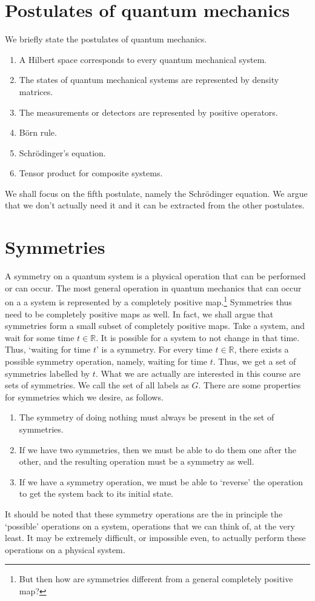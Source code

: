 \documentclass[a4 paper, 12pt]{book}
\theoremstyle{definition}
\newcommand{\rr}{\mathbb{R}}
\begin{document}
	\section{Postulates of quantum mechanics}

	We briefly state the postulates of quantum mechanics.
	\begin{enumerate}
	    \item A Hilbert space corresponds to every quantum mechanical system.
		\item The states of quantum mechanical systems are represented by density matrices.
		\item The measurements or detectors are represented by positive operators.
		\item B\"orn rule.
		\item Schr\"odinger's equation.
		\item Tensor product for composite systems.
	\end{enumerate}
	We shall focus on the fifth postulate, namely the Schr\"odinger equation. We argue that we don't actually need it and it can be extracted from the other postulates.

	\section{Symmetries}

	A symmetry on a quantum system is a physical operation that can be performed or can occur. The most general operation in quantum mechanics that can occur on a a system is represented by a completely positive map.\footnote{But then how are symmetries different from a general completely positive map?} Symmetries thus need to be completely positive maps as well. In fact, we shall argue that symmetries form a small subset of completely positive maps.
	Take a system, and wait for some time \(t \in \rr\). It is possible for a system to not change in that time. Thus, `waiting for time \(t\)' is a symmetry. For every time \(t \in \rr\), there exists a possible symmetry operation, namely, waiting for time \(t\). Thus, we get a set of symmetries labelled by \(t\). What we are actually are interested in this course are sets of symmetries. We call the set of all labels as \(G\). There are some properties for symmetries which we desire, as follows.
	\begin{enumerate}
	    \item The symmetry of doing nothing must always be present in the set of symmetries.
		\item If we have two symmetries, then we must be able to do them one after the other, and the resulting operation must be a symmetry as well.
		\item If we have a symmetry operation, we must be able to `reverse' the operation to get the system back to its initial state.
	\end{enumerate}
	It should be noted that these symmetry operations are the in principle the `possible' operations on a system, operations that we can think of, at the very least. It may be extremely difficult, or impossible even, to actually perform these operations on a physical system.
\end{document}
